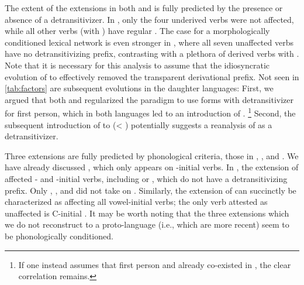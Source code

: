 The extent of the extensions in both \PWai and \PPek is fully predicted by the presence or absence of a detransitivizer.
In \PWai, only the four underived  verbs were not affected, while all other  verbs (with \detrz) have regular .
The case for a morphologically conditioned lexical network is even stronger in \PPek, where all seven unaffected verbs have no detransitivizing prefix, contrasting with a plethora of derived  verbs with .
Note that it is necessary for this analysis to assume that the idiosyncratic evolution of   to  effectively removed the transparent derivational prefix.
Not seen in \cref{tab:factors} are subsequent evolutions in the daughter languages:
First, we argued that both \ikpeng and \bakairi regularized the paradigm to use forms with detransitivizer for first person, which in both languages led to an introduction of .%
\footnote{If one instead assumes that first person  and  already co-existed in \PPek, the clear correlation remains.}
Second, the subsequent introduction of  to \ikpeng {}  (< ) potentially suggests a reanalysis of  as a detransitivizer.

Three extensions are fully predicted by phonological criteria, those in \akuriyo, \carijo, and \yukpa.
We have already discussed \akuriyo {} , which only appears on -initial verbs.
In \carijo, the extension of  affected - and -initial verbs, including   or  , which do not have a detransitivizing prefix.
Only  ,  , and   did not take on .
Similarly, the extension of \yukpa {} can succinctly be characterized as affecting all vowel-initial verbs; the only verb attested as unaffected is C-initial  .
It may be worth noting that the three extensions which we do not reconstruct to a proto-language (i.e., which are more recent) seem to be phonologically conditioned.

